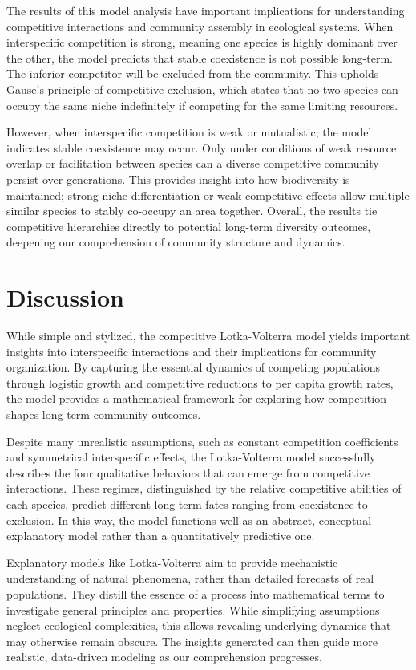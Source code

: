 The results of this model analysis have important implications for understanding competitive interactions and community assembly in ecological systems. When interspecific competition is strong, meaning one species is highly dominant over the other, the model predicts that stable coexistence is not possible long-term. The inferior competitor will be excluded from the community. This upholds Gause's principle of competitive exclusion, which states that no two species can occupy the same niche indefinitely if competing for the same limiting resources.

However, when interspecific competition is weak or mutualistic, the model indicates stable coexistence may occur. Only under conditions of weak resource overlap or facilitation between species can a diverse competitive community persist over generations. This provides insight into how biodiversity is maintained; strong niche differentiation or weak competitive effects allow multiple similar species to stably co-occupy an area together. Overall, the results tie competitive hierarchies directly to potential long-term diversity outcomes, deepening our comprehension of community structure and dynamics.

\section{Discussion}

While simple and stylized, the competitive Lotka-Volterra model yields important insights into interspecific interactions and their implications for community organization. By capturing the essential dynamics of competing populations through logistic growth and competitive reductions to per capita growth rates, the model provides a mathematical framework for exploring how competition shapes long-term community outcomes.

Despite many unrealistic assumptions, such as constant competition coefficients and symmetrical interspecific effects, the Lotka-Volterra model successfully describes the four qualitative behaviors that can emerge from competitive interactions. These regimes, distinguished by the relative competitive abilities of each species, predict different long-term fates ranging from coexistence to exclusion. In this way, the model functions well as an abstract, conceptual explanatory model rather than a quantitatively predictive one.

Explanatory models like Lotka-Volterra aim to provide mechanistic understanding of natural phenomena, rather than detailed forecasts of real populations. They distill the essence of a process into mathematical terms to investigate general principles and properties. While simplifying assumptions neglect ecological complexities, this allows revealing underlying dynamics that may otherwise remain obscure. The insights generated can then guide more realistic, data-driven modeling as our comprehension progresses.

